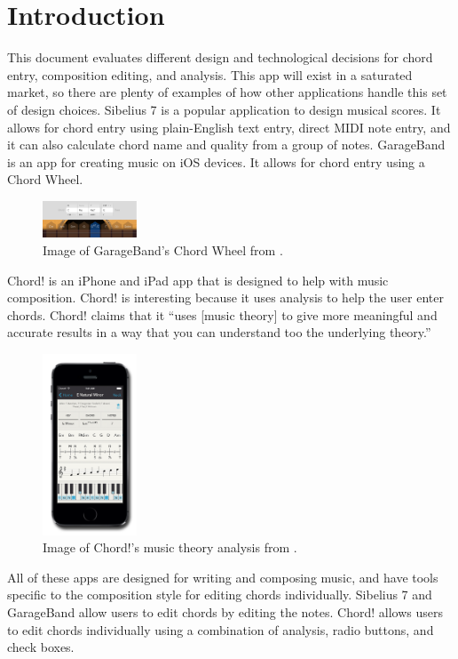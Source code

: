 \documentclass[onecolumn, draftclsnofoot,10pt, compsoc]{IEEEtran}
\begin{document}
\section{Introduction}
This document evaluates different design and technological decisions for chord entry, composition editing, and analysis.
This app will exist in a saturated market, so there are plenty of examples of how other applications handle this set of design choices.
Sibelius 7 is a popular application to design musical scores.
It allows for chord entry using plain-English text entry, direct MIDI note entry, and it can also calculate chord name and quality from a group of notes.
\cite{sibelius}
GarageBand is an app for creating music on iOS devices.
It allows for chord entry using a Chord Wheel.
\begin{figure}[h]
  \includegraphics[width=0.25\textwidth]{garageband.png}
  \caption{Image of GarageBand's Chord Wheel from \cite{garageband}.}
\end{figure}
\cite{garageband}
Chord! is an iPhone and iPad app that is designed to help with music composition.
Chord! is interesting because it uses analysis to help the user enter chords.
Chord! claims that it ``uses [music theory] to give more meaningful and accurate results in a way that you can understand too the underlying theory.''
\begin{figure}[h]
  \includegraphics[width=0.25\textwidth]{chord.png}
  \caption{Image of Chord!'s music theory analysis from \cite{chord}.}
\end{figure}
\cite{chord}
All of these apps are designed for writing and composing music,
and have tools specific to the composition style for editing chords individually.
Sibelius 7 and GarageBand allow users to edit chords by editing the notes.
Chord! allows users to edit chords individually using a combination of analysis, radio buttons, and check boxes.
\end{document}
